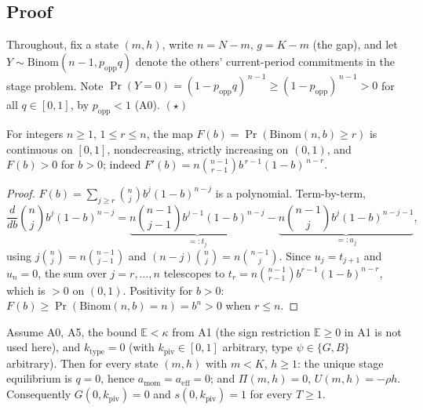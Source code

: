 \subsection*{Proof}

Throughout, fix a state $(m,h)$, write $n=N-m$, $g=K-m$ (the gap), and let
$Y\sim\mathrm{Binom}(n-1,p_{\mathrm{opp}}q)$ denote the others' current-period commitments in
the stage problem. Note
$\Pr(Y=0)=(1-p_{\mathrm{opp}}q)^{\,n-1}\ge(1-p_{\mathrm{opp}})^{\,n-1}>0$
for all $q\in[0,1]$, by $p_{\mathrm{opp}}<1$ (A0). $(\star)$

\begin{lemma}\label{lem:tail}
For integers $n\ge 1$, $1\le r\le n$, the map $F(b)=\Pr(\mathrm{Binom}(n,b)\ge r)$ is
continuous on $[0,1]$, nondecreasing, strictly increasing on $(0,1)$, and $F(b)>0$ for $b>0$;
indeed $F'(b)=n\binom{n-1}{r-1}b^{\,r-1}(1-b)^{\,n-r}$.
\end{lemma}

\begin{proof}
$F(b)=\sum_{j\ge r}\binom nj b^j(1-b)^{n-j}$ is a polynomial. Term-by-term,
\[
\frac{d}{db}\binom nj b^j(1-b)^{n-j}
=\underbrace{n\binom{n-1}{j-1}b^{j-1}(1-b)^{n-j}}_{=:t_j}
-\underbrace{n\binom{n-1}{j}b^{j}(1-b)^{n-j-1}}_{=:u_j},
\]
using $j\binom nj=n\binom{n-1}{j-1}$ and $(n-j)\binom nj=n\binom{n-1}{j}$. Since $u_j=t_{j+1}$
and $u_n=0$, the sum over $j=r,\dots,n$ telescopes to
$t_r=n\binom{n-1}{r-1}b^{r-1}(1-b)^{n-r}$, which is $>0$ on $(0,1)$. Positivity for $b>0$:
$F(b)\ge\Pr(\mathrm{Binom}(n,b)=n)=b^n>0$ when $r\le n$.
\end{proof}

\begin{lemma}\label{lem:noignition}
Assume A0, A5, the bound $\mathbb E<\kappa$ from A1 (the sign restriction $\mathbb E\ge 0$ in
A1 is not used here), and $k_{\mathrm{type}}=0$ (with $k_{\mathrm{piv}}\in[0,1]$ arbitrary,
type $\psi\in\{G,B\}$ arbitrary). Then for every state $(m,h)$ with $m<K$, $h\ge 1$: the unique
stage equilibrium is $q=0$, hence $a_{\mathrm{mom}}=a_{\mathrm{eff}}=0$; and $\Pi(m,h)=0$,
$U(m,h)=-\rho h$. Consequently $G(0,k_{\mathrm{piv}})=0$ and $s(0,k_{\mathrm{piv}})=1$ for
every $T\ge 1$.
\end{lemma}

